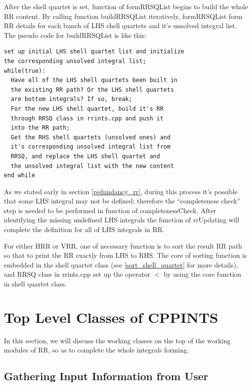After the shell quartet is set, function of formRRSQList begins to build 
the whole RR content. By calling function buildRRSQList iteratively, 
formRRSQList form RR details for each bunch of LHS shell quartets and it's 
unsolved integral list. The pseudo code for buildRRSQList is like this:
\begin{verbatim}
set up initial LHS shell quartet list and initialize 
the corresponding unsolved integral list;
while(true):  
  Have all of the LHS shell quartets been built in
  the existing RR path? Or the LHS shell quartets
  are bottom integrals? If so, break;
  For the new LHS shell quartet, build it's RR 
  through RRSQ class in rrints.cpp and push it
  into the RR path;
  Get the RHS shell quartets (unsolved ones) and 
  it's corresponding unsolved integral list from
  RRSQ, and replace the LHS shell quartet and 
  the unsolved integral list with the new content
end while 
\end{verbatim}

As we stated early in section \ref{redundancy_rr}, during 
this process it's possible that some LHS integral may 
not be defined; therefore the ``completeness check''
step is needed to be performed in function of completenessCheck.
After identifying the missing undefined LHS integrals
the function of rrUpdating will complete the definition
for all of LHS integrals in RR.

For either HRR or VRR, one of necessary function is to sort
the result RR path so that to print the RR exactly from 
LHS to RHS. The core of sorting function is embedded in the 
shell quartet class (see \ref{sort_shell_quartet} for more 
details), and RRSQ class in rrints.cpp set up the operator
$<$ by using the core function in shell quartet class.

\section{Top Level Classes of CPPINTS}

In this section, we will discuss the working classes on the top of 
the working modules of RR, so as to complete the whole integrals
forming.

\subsection{Gathering Input Information from User}
\label{infor_class}

